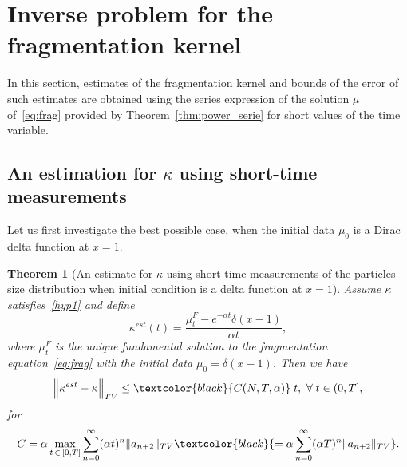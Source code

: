 \documentclass[10pt]{amsart}
\newtheorem{theo}{Theorem}[section]
\theoremstyle{definition}\newtheorem{defi}[theo]{Definition}\newtheorem{rema}[theo]{Remark}\newtheorem{exam}[theo]{Example}\newtheorem{exem}[theo]{Example}\newtheorem{nota}[theo]{Notation}
\renewcommand*\a{\alpha}
\newcommand{\MT}[1]{\textcolor{black}{#1}}
\let\oldforall\forall
\renewcommand*{\forall}{\mathrel{\oldforall}}
\begin{document}
\section{Inverse problem for the fragmentation kernel}\label{sec:short}


In this section, estimates of the fragmentation kernel and bounds of the error of such estimates are obtained using the series expression of the solution $\mu$ of~\eqref{eq:frag} provided by Theorem~\ref{thm:power_serie} for short values of the time variable.


\subsection{An estimation for \texorpdfstring{$\kappa$}{kappa} using short-time measurements} 
Let us first investigate the best possible case, when the initial data $\mu _0$ is a Dirac delta function at $x=1.$

\begin{theo}[An estimate for $\kappa$ using short-time measurements of the particles size distribution when initial condition is a delta function at $x=1$]\label{thm:short}
Assume $\kappa$ satisfies~\eqref{hyp1} and define
\begin{equation}\label{k_est_F}
\kappa^{est}(t)= \dfrac{\mu_t^{F} - e^{-\a t} \delta(x-1) }{\a t},
\end{equation}
where $\mu_t^{F}$ is the unique fundamental solution to the fragmentation equation~\eqref{eq:frag} with the initial data $\mu_0 = \delta(x-1)$. Then we have
\begin{equation}\label{estkappaC}
\Big\|\kappa^{est}-\kappa\Big\|_{TV} \leq \MT{C(N,T,\alpha)}\; t,\,\,\forall t\in (0, T], 
\end{equation}
for
\begin{equation}\label{constantcT}
C= \a \max_{t\,\in\,\left[0,T\right]}\sum\limits_{n=0}^{\infty} (\a t)^n \|a_{n+2}\|_{TV}
\MT{= \a \sum\limits_{n=0}^{\infty} (\a T)^n \|a_{n+2}\|_{TV}}.
\end{equation}
\end{theo}
\end{document}
